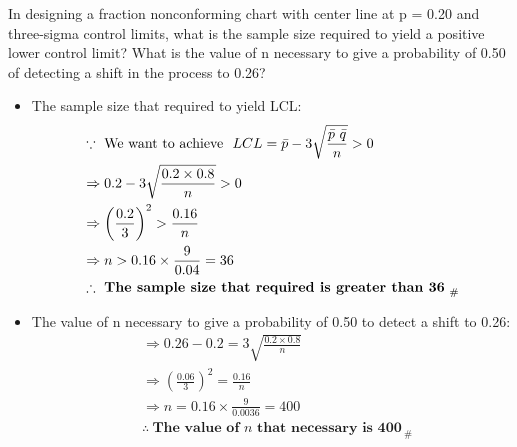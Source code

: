In designing a fraction nonconforming chart with center line at p = 0.20 and three-sigma control limits, what is the sample size required to yield a positive lower control limit? What is the value of n necessary to give a probability of 0.50 of detecting a shift in the process to 0.26?

\begin{itemize}
    \item The sample size that required to yield LCL:
        \begin{align*}
            &\because \ \text{We want to achieve } \ LCL = \Bar{p} - 3 \sqrt{\frac{\Bar{p} \ \Bar{q}}{n}} > 0\\
            &\Rightarrow 0.2 - 3\sqrt{\frac{0.2 \times 0.8}{n}} > 0 \\
            &\Rightarrow \left(\frac{0.2}{3} \right)^2 > \frac{0.16}{n}\\
            &\Rightarrow n > 0.16 \times \frac{9}{0.04} = 36\\
            &\therefore \ \textbf{The sample size that required is greater than 36}_{\ \#}
        \end{align*}
        
    \item The value of n necessary to give a probability of 0.50 to detect a shift to 0.26: 
        \begin{align*}
            &\Rightarrow 0.26 - 0.2 = 3\sqrt{\frac{0.2 \times 0.8}{n}}\\
            &\Rightarrow \left(\frac{0.06}{3} \right)^2 = \frac{0.16}{n}\\
            &\Rightarrow n = 0.16 \times \frac{9}{0.0036} = 400\\
            &\therefore \ \textbf{The value of $n$ that necessary is 400}_{\ \#}
        \end{align*}
    
\end{itemize}
